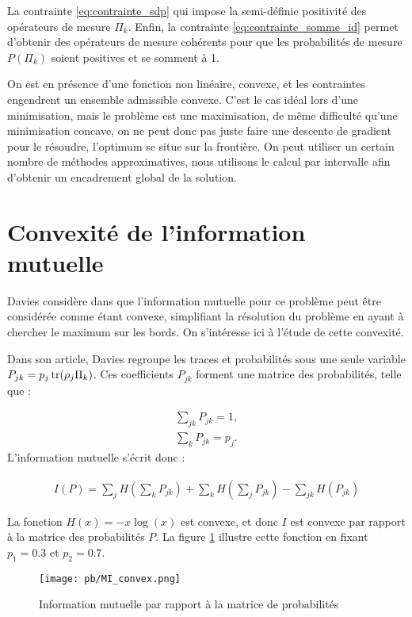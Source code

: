 La contrainte \ref{eq:contrainte_sdp} qui impose la semi-définie positivité des opérateurs de mesure $\Pi_k$. Enfin, la contrainte \ref{eq:contrainte_somme_id} permet d'obtenir des opérateurs de mesure cohérents pour que les probabilités de mesure $P(\Pi_k)$ soient positives et se somment à 1.

On est en présence d'une fonction non linéaire, convexe, et les contraintes engendrent un ensemble admissible convexe. C'est le cas idéal lors d'une minimisation, mais le problème est une maximisation, de même difficulté qu'une minimisation concave, on ne peut donc pas juste faire une descente de gradient pour le résoudre, l'optimum se situe sur la frontière. On peut utiliser un certain nombre de méthodes approximatives, nous utilisons le calcul par intervalle afin d'obtenir un encadrement global de la solution.

\section{Convexité de l'information mutuelle}
Davies considère dans \cite{Davies78} que l'information mutuelle pour ce problème peut être considérée comme étant convexe, simplifiant la résolution du problème en ayant à chercher le maximum sur les bords. On s'intéresse ici à l'étude de cette convexité.

Dans son article, Davies regroupe les traces et probabilités sous une seule variable $P_{jk} = p_j \operatorname{tr}(\rho_j \Pi_k)$. Ces coefficients $P_{jk}$ forment une matrice des probabilités, telle que :

\begin{align}
    \displaystyle \sum_{jk} P_{jk} = 1, \\
    \displaystyle \sum_{k}  P_{jk} = p_j.
\end{align}
L'information mutuelle s'écrit donc :

\begin{align}
    I(P) = \displaystyle \sum_{j} H(\displaystyle \sum_{k}P_{jk}) + \displaystyle \sum_{k} H(\displaystyle \sum_{j}P_{jk}) -  \displaystyle \sum_{jk} H(P_{jk}) 
\end{align}

La fonction $H(x) = -x \log(x)$ est convexe, et donc $I$ est convexe par rapport à la matrice des probabilités $P$. La figure \ref{fig:mi_convex} illustre cette fonction en fixant $p_1 = 0.3$ et $p_2 = 0.7$.

\begin{figure}[h]
    \centering
    \texttt{[image: pb/MI\_convex.png]}
    \caption{Information mutuelle par rapport à la matrice de probabilités}
    \label{fig:mi_convex}
\end{figure}

